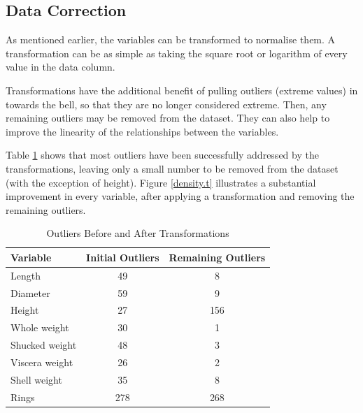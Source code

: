 \documentclass[11pt, a4paper]{article}
\begin{document}
    \subsection{Data Correction}

    As mentioned earlier, the variables can be transformed to normalise them. A transformation can be as simple as taking the square root or logarithm of every value in the data column. 

    Transformations have the additional benefit of pulling outliers (extreme values) in towards the bell, so that they are no longer considered extreme. Then, any remaining outliers may be removed from the dataset. They can also help to improve the linearity of the relationships between the variables.

    Table \ref{outliers} shows that most outliers have been successfully addressed by the transformations, leaving only a small number to be removed from the dataset (with the exception of height). Figure \ref{density.t} illustrates a substantial improvement in every variable, after applying a transformation and removing the remaining outliers. 
    
    \begin{table}[ht]
        \centering
        \begin{tabular}{|l|c|c|}
            \hline
            Variable&Initial Outliers&Remaining Outliers \\
            \hline
            Length & 49 & 8 \\
            Diameter & 59 & 9 \\
            Height & 27 & 156 \\
            Whole weight & 30 & 1 \\
            Shucked weight & 48 & 3 \\
            Viscera weight & 26 & 2 \\
            Shell weight & 35 & 8 \\
            Rings & 278 & 268 \\
            \hline
        \end{tabular}
        \caption{Outliers Before and After Transformations}
        \label{outliers}
    \end{table}
\end{document}
